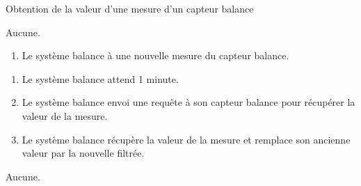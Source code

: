 ﻿\begin{UseCase}{Obtention de la valeur d’une mesure d’un capteur balance}



    \begin{UseCasePre}
        Aucune.
    \end{UseCasePre}

    \begin{UseCasePost}
        \begin{enumerate}
            \item Le système balance à une nouvelle mesure du capteur balance.
        \end{enumerate}
    \end{UseCasePost}

\begin{UseCaseScenario}
    \begin{enumerate}
        \item Le système balance attend 1 minute.
        \item Le système balance envoi une requête à son capteur balance pour
            récupérer la valeur de la mesure.
        \item Le système balance récupère la valeur de la mesure et remplace
            son ancienne valeur par la nouvelle filtrée.
    \end{enumerate}
\end{UseCaseScenario}

    \begin{UseCaseExtension}
        Aucune.
    \end{UseCaseExtension}

\end{UseCase}